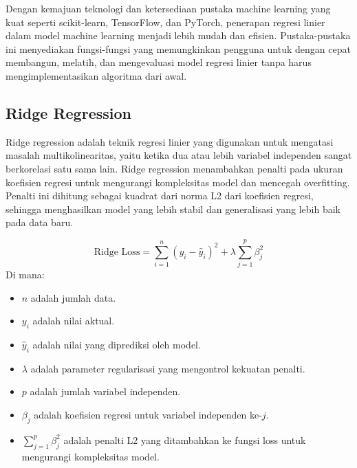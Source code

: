
Dengan kemajuan teknologi dan ketersediaan pustaka machine learning yang kuat seperti scikit-learn, TensorFlow, dan PyTorch, penerapan regresi linier dalam model machine learning menjadi lebih mudah dan efisien. Pustaka-pustaka ini menyediakan fungsi-fungsi yang memungkinkan pengguna untuk dengan cepat membangun, melatih, dan mengevaluasi model regresi linier tanpa harus mengimplementasikan algoritma dari awal.

\subsection{Ridge Regression}
Ridge regression adalah teknik regresi linier yang digunakan untuk mengatasi masalah multikolinearitas, yaitu ketika dua atau lebih variabel independen sangat berkorelasi satu sama lain. Ridge regression menambahkan penalti pada ukuran koefisien regresi untuk mengurangi kompleksitas model dan mencegah overfitting. Penalti ini dihitung sebagai kuadrat dari norma L2 dari koefisien regresi, sehingga menghasilkan model yang lebih stabil dan generalisasi yang lebih baik pada data baru.

\begin{equation}
    \text{Ridge Loss} = \sum_{i=1}^{n} (y_i - \hat{y}_i)^2 + \lambda \sum_{j=1}^{p} \beta_j^2
\end{equation}
Di mana:
\begin{itemize}
    \item $n$ adalah jumlah data.
    \item $y_i$ adalah nilai aktual.
    \item $\hat{y}_i$ adalah nilai yang diprediksi oleh model.
    \item $\lambda$ adalah parameter regularisasi yang mengontrol kekuatan penalti.
    \item $p$ adalah jumlah variabel independen.
    \item $\beta_j$ adalah koefisien regresi untuk variabel independen ke-$j$.
    \item $\sum_{j=1}^{p} \beta_j^2$ adalah penalti L2 yang ditambahkan ke fungsi loss untuk mengurangi kompleksitas model.
\end{itemize}

